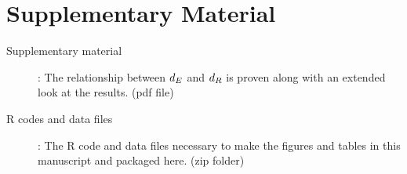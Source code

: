 \section*{Supplementary Material}

\begin{description}

\item[Supplementary material]: The relationship between ${d_E}$ and ${d_R}$ is proven along with an extended look at the results. (pdf file) 

\item[R codes and data files]: The R code and data files necessary to make the figures and tables in this manuscript and packaged here. (zip folder)

\end{description}


